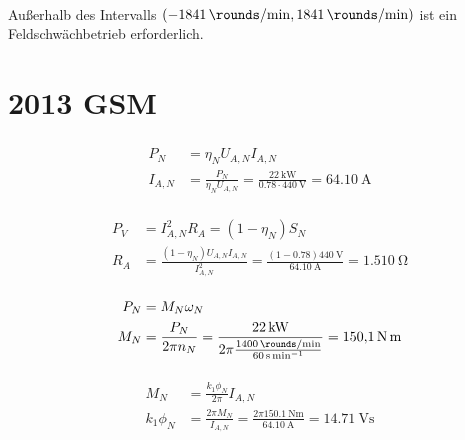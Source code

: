 \documentclass[11pt,a4paper]{scrartcl}
\newcommand{\mybr}[1]{\left(#1\right)}
\newcommand{\0}{_{\mybr{0}}}
\newcommand{\1}{_{\mybr{1}}}
\newcommand{\2}{_{\mybr{2}}}
\begin{document}
\subsection{}
Außerhalb des Intervalls $\mybr{\SI{-1841}{\rounds\per\minute},\SI{1841}{\rounds\per\minute}}$ ist ein Feldschwächbetrieb erforderlich.

\clearpage
\part{2013 GSM}
\section{}
\subsection{}
\begin{align}
P_N&=\eta_N U_{A,N} I_{A,N}\\
I_{A,N}&=\frac{P_N}{\eta_N U_{A,N}}=\frac{\SI{22}{\kilo\watt}}{\num{0.78}\cdot\SI{440}{\volt}}=\SI{64.10}{\ampere}
\end{align}

\subsection{}
\begin{align}
P_V&=I_{A,N}^2 R_A=\mybr{1-\eta_N}S_N\\
R_A&=\frac{\mybr{1-\eta_N} U_{A,N} I_{A,N}}{I_{A,N}^2}=\frac{\mybr{1-\num{0.78}}\SI{440}{\volt}}{\SI{64.10}{\ampere}}=\SI{1.510}{\ohm}
\end{align}

\subsection{}
\begin{align}
P_N&=M_N \omega_N\\
M_N&=\frac{P_N}{2\pi n_N}=\frac{\SI{22}{\kilo\watt}}{2\pi\frac{\SI{1400}{\rounds\per\minute}}{\SI{60}{\second\per\minute}}}=\SI{150.1}{\newton\metre}
\end{align}

\subsection{}
\begin{align}
M_N&=\frac{k_1\phi_N}{2\pi}I_{A,N}\\
k_1\phi_N&=\frac{2\pi M_N}{I_{A,N}}=\frac{2\pi \SI{150.1}{\newton\metre}}{\SI{64.10}{\ampere}}=\SI{14.71}{\volt\second}
\end{align}
\end{document}
